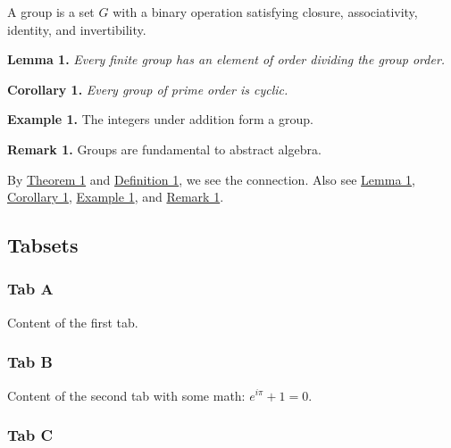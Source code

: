 \documentclass[11pt]{article}
\begin{document}
A group is a set $G$ with a binary operation satisfying closure, associativity, identity, and invertibility.

\medskip

\par\medskip\noindent\textbf{Lemma 1.}\label{lem-helper} \itshape{} Every finite group has an element of order dividing the group order.

\upshape\medskip

\par\medskip\noindent\textbf{Corollary 1.}\label{cor-consequence} \itshape{} Every group of prime order is cyclic.

\upshape\medskip

\par\medskip\noindent\textbf{Example 1.}\label{exm-integers} The integers under addition form a group.

\medskip

\par\medskip\noindent\textbf{Remark 1.}\label{rem-note} Groups are fundamental to abstract algebra.

\medskip

By \hyperref[thm-fermat]{Theorem 1} and \hyperref[def-group]{Definition 1}, we see the connection. Also see \hyperref[lem-helper]{Lemma 1}, \hyperref[cor-consequence]{Corollary 1}, \hyperref[exm-integers]{Example 1}, and \hyperref[rem-note]{Remark 1}.

\subsection{Tabsets}
\label{tabsets}



\subsubsection{Tab A}
\label{tab-a}

Content of the first tab.

\subsubsection{Tab B}
\label{tab-b}

Content of the second tab with some math: $e^{i\pi} + 1 = 0$.

\subsubsection{Tab C}
\label{tab-c}
\end{document}
